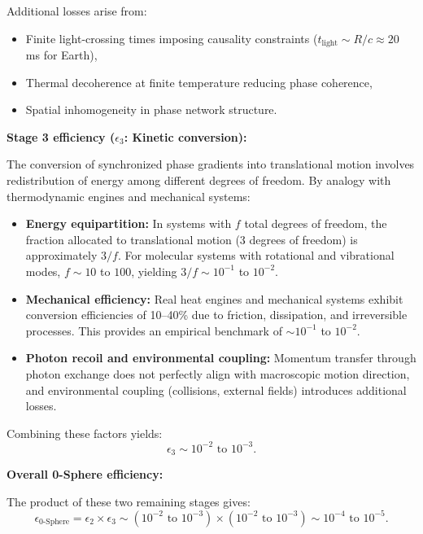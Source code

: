 \documentclass[12pt,letterpaper]{article}
\begin{document}
Additional losses arise from:
\begin{itemize}
\item Finite light-crossing times imposing causality constraints ($t_{\text{light}} \sim R/c \approx 20$ ms for Earth),
\item Thermal decoherence at finite temperature reducing phase coherence,
\item Spatial inhomogeneity in phase network structure.
\end{itemize}

\textbf{Stage 3 efficiency ($\epsilon_3$: Kinetic conversion):}

The conversion of synchronized phase gradients into translational motion involves redistribution of energy among different degrees of freedom. By analogy with thermodynamic engines and mechanical systems:

\begin{itemize}
\item \textbf{Energy equipartition:} In systems with $f$ total degrees of freedom, the fraction allocated to translational motion (3 degrees of freedom) is approximately $3/f$. For molecular systems with rotational and vibrational modes, $f \sim 10$ to $100$, yielding $3/f \sim 10^{-1}$ to $10^{-2}$.

\item \textbf{Mechanical efficiency:} Real heat engines and mechanical systems exhibit conversion efficiencies of 10--40\% due to friction, dissipation, and irreversible processes. This provides an empirical benchmark of $\sim 10^{-1}$ to $10^{-2}$.

\item \textbf{Photon recoil and environmental coupling:} Momentum transfer through photon exchange does not perfectly align with macroscopic motion direction, and environmental coupling (collisions, external fields) introduces additional losses.
\end{itemize}

Combining these factors yields:
\begin{equation}
\epsilon_3 \sim 10^{-2} \text{ to } 10^{-3}.
\end{equation}

\textbf{Overall 0-Sphere efficiency:}

The product of these two remaining stages gives:
\begin{equation}
\epsilon_{\text{0-Sphere}} = \epsilon_2 \times \epsilon_3 \sim (10^{-2} \text{ to } 10^{-3}) \times (10^{-2} \text{ to } 10^{-3}) \sim 10^{-4} \text{ to } 10^{-5}.
\end{equation}
\end{document}
